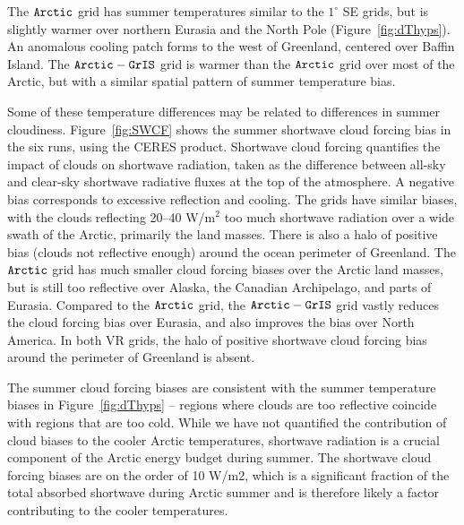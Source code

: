 \documentclass[draft]{agujournal2019}
\begin{document}
The $\tt Arctic$ grid has summer temperatures similar to the $1^{\circ}$ SE grids, but is slightly warmer over northern Eurasia and the North Pole (Figure~\ref{fig:dThyps}). An anomalous cooling patch forms to the west of Greenland, centered over Baffin Island. The $\tt Arctic-GrIS$ grid is warmer than the $\tt Arctic$ grid over most of the Arctic, but with a similar spatial pattern of summer temperature bias.

Some of these temperature differences may be related to differences in summer cloudiness. Figure~\ref{fig:SWCF} shows the summer shortwave cloud forcing bias in the six runs, using the CERES product. Shortwave cloud forcing quantifies the impact of clouds on shortwave radiation, taken as the difference between all-sky and clear-sky shortwave radiative fluxes at the top of the atmosphere. A negative bias corresponds to excessive reflection and cooling. The {\color{blue}{lat-lon and quasi-uniform}} grids have similar biases, with the clouds reflecting 20--40 W/m$^2$ too much shortwave radiation over a wide swath of the Arctic, primarily the land masses. There is also a halo of positive bias (clouds not reflective enough) around the ocean perimeter of Greenland. The $\tt Arctic$ grid has much smaller cloud forcing biases over the Arctic land masses, but is still too reflective over Alaska, the Canadian Archipelago, and parts of Eurasia.  Compared to the $\tt Arctic$ grid, the $\tt Arctic-GrIS$ grid vastly reduces the cloud forcing bias over Eurasia, and also improves the bias over North America. In both VR grids, the halo of positive shortwave cloud forcing bias around the perimeter of Greenland is absent.

The summer cloud forcing biases are consistent with the summer temperature biases in Figure~\ref{fig:dThyps} -- regions where clouds are too reflective coincide with regions that are too cold. While we have not quantified the contribution of cloud biases to the cooler Arctic temperatures, shortwave radiation is a crucial component of the Arctic energy budget during summer. The shortwave cloud forcing biases are on the order of 10 W/m2, which is a significant fraction of the total absorbed shortwave {\color{blue}{radiation}} during Arctic summer  \cite{SETAL2007JGR} and is therefore likely a factor contributing to the cooler temperatures.
\end{document}
